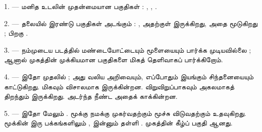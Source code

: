%
%

\VUsaut{4.0mm}
\VUsaut{2.0mm}

\VUsaut{2.4mm}
\VUsaut{3.0mm}

\VUsaut{3.0mm}

1. --- மனித உடலின் முதன்மையான பகுதிகள் : , ,
.

2. --- தலையில் இரண்டு பகுதிகள் அடங்கும் : , அதற்குள்
 இருக்கிறது, அதை  மூடுகிறது ; பிறகு
.

3. --- நம்முடைய படத்தில் மண்டையோட்டையும் மூளையையும் பார்க்க முடியவில்லை ;
ஆனால் முகத்தின் முக்கியமான பகுதிகளை மிகத் தெளிவாகப் பார்க்கிறோம்.

4. --- இதோ முதலில்  ; அது வலிய அறிவையும், எப்போதும் இயங்கும்
சிந்தனையையும் காட்டுகிறது.  மிகவும் விசாலமாக இருக்கின்றன.
 விறுவிறுப்பாகவும் அகலமாகத் திறந்தும் இருக்கிறது. அடர்ந்த
 நீண்ட  அதைக் காக்கின்றன.

5. --- இதோ மேலும்  . மூக்கு நமக்கு
முகர்வதற்கும் மூச்சு விடுவதற்கும் உதவுகிறது. மூக்கின் இரு பக்கங்களிலும்
, இன்னும் தள்ளி . முகத்தின் கீழ்ப் பகுதி
  ஆனது.

